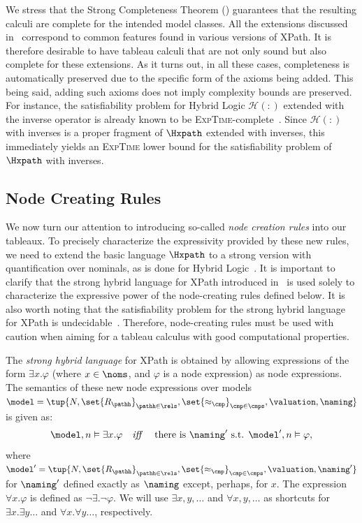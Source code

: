 We stress that the Strong Completeness Theorem () guarantees that the resulting calculi are complete for the intended model classes.  All the extensions discussed in~ correspond to common features found in various versions of XPath. It is therefore desirable to have tableau calculi that are not only sound but also complete for these extensions. As it turns out, in all these cases, completeness is automatically preserved due to the specific form of the axioms being added. This being said, adding such axioms does not imply complexity bounds are preserved.  
For instance, the satisfiability problem for Hybrid Logic $\mathcal{H}(:)$ extended with the inverse operator is already known to be \textsc{ExpTime}-complete~\cite{Areces2000c}. Since $\mathcal{H}(:)$ with inverses is a proper fragment of $\Hxpath$ extended with inverses, this immediately yields an \textsc{ExpTime} lower bound for the satisfiability problem of $\Hxpath$ with inverses.

\subsection{Node Creating Rules} We now turn our attention to introducing so-called \emph{node creation rules} into our tableaux. To precisely characterize the expressivity provided by these new rules, we need to extend the basic language $\Hxpath$ to a strong version with quantification over nominals, as is done for Hybrid Logic~\cite{BlackburnS95}. It is important to clarify that the strong hybrid language for XPath introduced in~ is used solely to characterize the expressive power of the node-creating rules defined below. It is also worth noting that the satisfiability problem for the strong hybrid language for XPath is undecidable~\cite{arec:hybr05b}. Therefore, node-creating rules must be used with caution when aiming for a tableau calculus with good computational properties. 

\begin{defi}\label{def:strong}
    \label{def:stronghl}
    The \emph{strong hybrid language} for XPath is obtained by allowing expressions of the form $\exists x.\varphi$ (where $x\in\noms$, and $\varphi$ is a node expression) as node expressions.
    The semantics of these new node expressions over models $\model = \tup{N, \set{R_\pathh}_{\pathh \in \rels}, \set{\approx_{\cmp}}_{\cmp\in\cmps}, \valuation, \naming}$ is given as:
    \[
        \begin{array}{lcl}
            \model,n\vDash\exists x.\varphi & \text{\it iff } & \text{there is $ \naming'$ s.t. } \model',n\vDash \varphi,
        \end{array}
    \]
    where $\model'= \tup{N, \set{R_\pathh}_{\pathh \in \rels}, \set{\approx_{\cmp}}_{\cmp\in\cmps}, \valuation, \naming'}$ for  $\naming'$ defined exactly as $\naming$ except, perhaps, for $x$. The expression $\forall x.\varphi$ is defined as $\neg\exists.\neg\varphi$.  We will use $\exists x,y,\ldots$ and $\forall x,y,\ldots$ as shortcuts for $\exists x.\exists y\ldots$ and $\forall x.\forall y\ldots$, respectively.
\end{defi}

